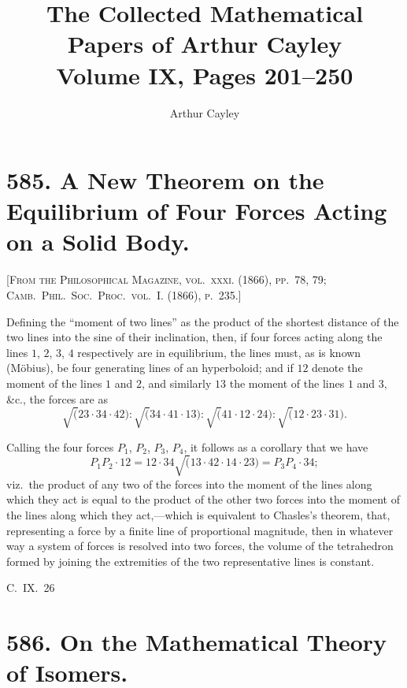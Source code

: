 \documentclass[11pt,a4paper]{article}
\title{The Collected Mathematical Papers of Arthur Cayley\\Volume IX, Pages 201--250}
\author{Arthur Cayley}
\date{}
\theoremstyle{plain}
\theoremstyle{definition}
\theoremstyle{remark}
\begin{document}
\maketitle

\tableofcontents
\newpage

\section*{585. A New Theorem on the Equilibrium of Four Forces Acting on a Solid Body.}

\noindent\textsc{[From the Philosophical Magazine, vol.~\textsc{xxxi}. (1866), pp.~78, 79;\\Camb.\ Phil.\ Soc.\ Proc.\ vol.~\textsc{I}. (1866), p.~235.]}

\medskip

Defining the ``moment of two lines'' as the product of the shortest distance of the two lines into the sine of their inclination, then, if four forces acting along the lines $1$, $2$, $3$, $4$ respectively are in equilibrium, the lines must, as is known (M\"obius), be four generating lines of an hyperboloid; and if $12$ denote the moment of the lines $1$ and $2$, and similarly $13$ the moment of the lines $1$ and $3$, \&c., the forces are as
\[
\surd(23 \cdot 34 \cdot 42) : \surd(34 \cdot 41 \cdot 13) : \surd(41 \cdot 12 \cdot 24) : \surd(12 \cdot 23 \cdot 31).
\]

Calling the four forces $P_1$, $P_2$, $P_3$, $P_4$, it follows as a corollary that we have
\[
P_1 P_2 \cdot 12 = 12 \cdot 34 \surd(13 \cdot 42 \cdot 14 \cdot 23) = P_3 P_4 \cdot 34;
\]
viz.\ the product of any two of the forces into the moment of the lines along which they act is equal to the product of the other two forces into the moment of the lines along which they act,---which is equivalent to Chasles's theorem, that, representing a force by a finite line of proportional magnitude, then in whatever way a system of forces is resolved into two forces, the volume of the tetrahedron formed by joining the extremities of the two representative lines is constant.

\hfill C.~IX.~26

\newpage

\section*{586. On the Mathematical Theory of Isomers.}
\end{document}
